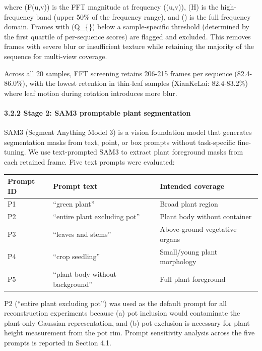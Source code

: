 \documentclass[11pt,a4paper]{article}
\begin{document}
where (F(u,v)) is the FFT magnitude at frequency ((u,v)), (H) is the
high-frequency band (upper 50\% of the frequency range), and (\Omega) is
the full frequency domain. Frames with (Q\_\{\}) below a
sample-specific threshold (determined by the first quartile of
per-sequence scores) are flagged and excluded. This removes frames with
severe blur or insufficient texture while retaining the majority of the
sequence for multi-view coverage.

Across all 20 samples, FFT screening retains 206-215 frames per sequence
(82.4-86.0\%), with the lowest retention in thin-leaf samples
(XianKeLai: 82.4-83.2\%) where leaf motion during rotation introduces
more blur.

\paragraph{3.2.2 Stage 2: SAM3 promptable plant
segmentation}\label{stage-2-sam3-promptable-plant-segmentation}

SAM3 (Segment Anything Model 3) is a vision foundation model that
generates segmentation masks from text, point, or box prompts without
task-specific fine-tuning. We use text-prompted SAM3 to extract plant
foreground masks from each retained frame. Five text prompts were
evaluated:

{\def\LTcaptype{none} %
\begin{longtable}[]{@{}lll@{}}
\toprule\noalign{}
Prompt ID & Prompt text & Intended coverage \\
\midrule\noalign{}
\endhead
\bottomrule\noalign{}
\endlastfoot
P1 & ``green plant'' & Broad plant region \\
P2 & ``entire plant excluding pot'' & Plant body without container \\
P3 & ``leaves and stems'' & Above-ground vegetative organs \\
P4 & ``crop seedling'' & Small/young plant morphology \\
P5 & ``plant body without background'' & Full plant foreground \\
\end{longtable}
}

P2 (``entire plant excluding pot'') was used as the default prompt for
all reconstruction experiments because (a) pot inclusion would
contaminate the plant-only Gaussian representation, and (b) pot
exclusion is necessary for plant height measurement from the pot rim.
Prompt sensitivity analysis across the five prompts is reported in
Section 4.1.
\end{document}
